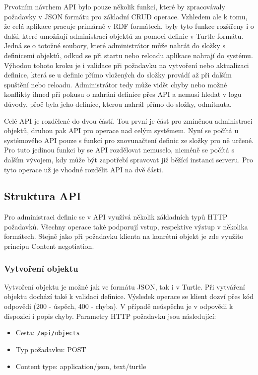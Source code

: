 \documentclass[thesis=B,czech]{FITthesis}[2012/06/26]
\begin{document}
  Prvotním návrhem API bylo pouze několik funkcí, které by zpracovávaly požadavky v JSON formátu pro základní CRUD
  operace. Vzhledem ale k tomu, že celá aplikace pracuje primárně v RDF formátech, byly tyto funkce rozšířeny i o další, které umožňují administraci
  objektů za pomoci definic v Turtle formátu. Jedná se o totožné soubory, které administrátor může nahrát do složky s definicemi objektů, odkud se 
  při startu nebo reloadu aplikace nahrají do systému. Výhodou tohoto kroku je i validace při požadavku na vytvoření nebo aktualizaci definice,
  která se u definic přímo vložených do složky provádí až při dalším spuštění nebo reloadu. Administrátor tedy může vidět chyby nebo možné konflikty
  ihned při pokusu o nahrání definice přes API a nemusí hledat v logu důvody, přoč byla jeho definice, kterou nahrál přímo do složky, odmítnuta.
  
  Celé API je rozdělené do dvou částí. Tou první je část pro zmíněnou administraci objektů, druhou pak API pro operace nad celým systémem.
  Nyní se počítá u systémového API pouze s funkcí pro znovunačtení definic ze složky pro ně určené. Pro tuto jedinou funkci by se API rozdělovat nemuselo,
  nicméně se počítá s dalším vývojem, kdy může být zapotřebí spravovat již běžící instanci serveru. Pro tyto operace už je vhodné rozdělit API na dvě části.
  
  \subsection{Struktura API}
  Pro administraci definic se v API využívá několik základních typů HTTP požadavků. Všechny operace také podporují vstup, respektive výstup v několika
  formátech. Stejně jako při požadavku klienta na konrétní objekt je zde využito principu Content negotiation.
  
  \subsubsection{Vytvoření objektu}
  Vytvoření objektu je možné jak ve formátu JSON, tak i v Turtle. Při vytváření objektu dochází také k validaci definice.
  Výsledek operace se klient dozví přes kód odpovědi (200 - úspěch, 400 - chyba). V případě neúspěchu je v odpovědi k dispozici i popis chyby.
  Parametry HTTP požadavku jsou následující:
  \begin{itemize}
   \item Cesta: \texttt{/api/objects}
   \item Typ požadavku: POST
   \item Content type: application/json, text/turtle
  \end{itemize}
  
\end{document}

